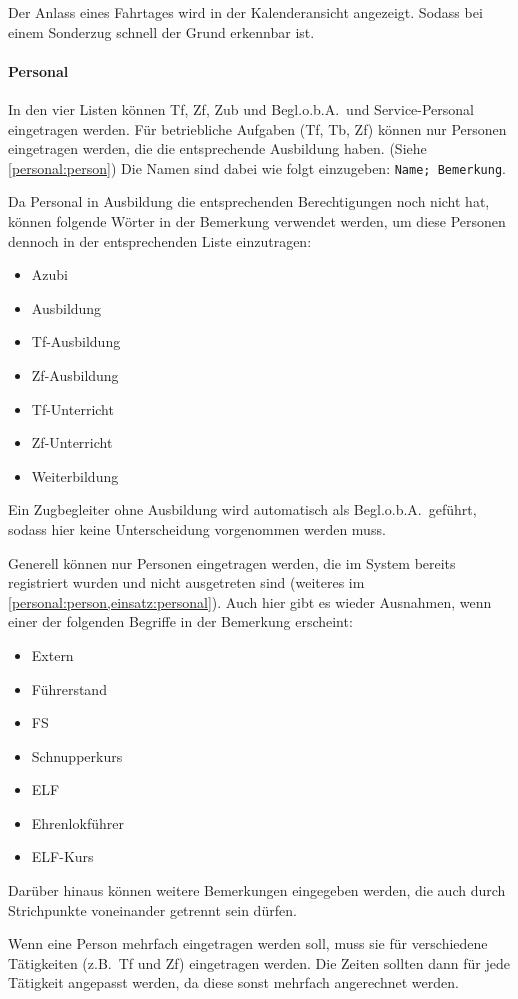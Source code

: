 Der Anlass eines Fahrtages wird in der Kalenderansicht angezeigt.
Sodass bei einem Sonderzug schnell der Grund erkennbar ist.

\paragraph{Personal}
In den vier Listen können Tf, Zf, Zub und Begl.o.b.A.\ und Service-Personal eingetragen werden.
Für betriebliche Aufgaben (Tf, Tb, Zf) können nur Personen eingetragen werden, die die entsprechende Ausbildung haben.
(Siehe \cref{personal:person})
Die Namen sind dabei wie folgt einzugeben: \texttt{Name; Bemerkung}.

Da Personal in Ausbildung die entsprechenden Berechtigungen noch nicht hat, können folgende Wörter in der Bemerkung verwendet werden, um diese Personen dennoch in der entsprechenden Liste einzutragen:
\begin{itemize}
	\item Azubi
	\item Ausbildung
	\item Tf-Ausbildung
	\item Zf-Ausbildung
	\item Tf-Unterricht
	\item Zf-Unterricht
	\item Weiterbildung
\end{itemize}
Ein Zugbegleiter ohne Ausbildung wird automatisch als Begl.o.b.A.\ geführt, sodass hier keine Unterscheidung vorgenommen werden muss.

Generell können nur Personen eingetragen werden, die im System bereits registriert wurden und nicht ausgetreten sind
(weiteres im \cref{personal:person,einsatz:personal}).
Auch hier gibt es wieder Ausnahmen, wenn einer der folgenden Begriffe in der Bemerkung erscheint:
\begin{itemize}
	\item Extern
	\item Führerstand
	\item FS
	\item Schnupperkurs
	\item ELF
	\item Ehrenlokführer
	\item ELF-Kurs
\end{itemize}
Darüber hinaus können weitere Bemerkungen eingegeben werden, die auch durch Strichpunkte voneinander getrennt sein dürfen.

\begin{hinweis}
  Wenn eine Person mehrfach eingetragen werden soll, muss sie für verschiedene Tätigkeiten (z.B.\ Tf und Zf) eingetragen werden.
  Die Zeiten sollten dann für jede Tätigkeit angepasst werden, da diese sonst mehrfach angerechnet werden.
\end{hinweis}



